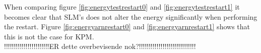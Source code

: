 When comparing figure \ref{fig:energytestrestart0} and \ref{fig:energytestrestart1} it becomes clear that SLM's does not alter the energy significantly when performing the restart. Figure \ref{fig:energyarnrestart0} and \ref{fig:energyarnrestart1} shows that this is not the case for KPM.\\

!!!!!!!!!!!!!!!!!!!!!!!ER dette overbevisende nok?!!!!!!!!!!!!!!!!!!!!!!!!!!!!!\\